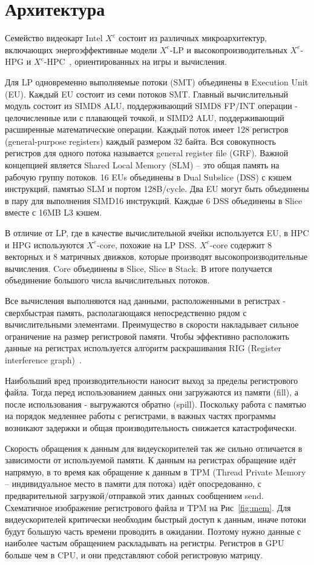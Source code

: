 \section{Архитектура}
\label{sec:Arch}

Семейство видеокарт Intel $X^e$ состоит из различных микроархитектур, включающих энергоэффективные модели $X^e$-LP и высокопроизводительных $X^e$-HPG и $X^e$-HPC~\cite{intelArch}, ориентированных на игры и вычисления.

Для LP одновременно выполняемые потоки (SMT) объединены в Execution Unit (EU).
Каждый EU состоит из семи потоков SMT. Главный вычислительный модуль состоит из SIMD8 ALU, поддерживающий SIMD8 FP/INT операции - целочисленные или с плавающей точкой, и SIMD2 ALU, поддерживающий расширенные математические операции.
Каждый поток имеет 128 регистров (general-purpose registers) каждый размером 32 байта.
Вся совокупность регистров для одного потока называется general register file (GRF).
Важной концепцией является Shared Local Memory (SLM) -- это общая память на рабочую группу потоков.
16 EUs объединены в Dual Subslice (DSS) с кэшем инструкций, памятью SLM и портом 128B/cycle.
Два EU могут быть объединены в пару для выполнения SIMD16 инструкций. Каждые 6 DSS объединены в Slice вместе с 16MB L3 кэшем.

В отличие от LP, где в качестве вычислительной ячейки используется EU, в HPC и HPG используются $X^e$-core, похожие на LP DSS.
$X^e$-core содержит 8 векторных и 8 матричных движков, которые производят высокопроизводительные вычисления.
Core объединены в Slice, Slice в Stack.
В итоге получается объединение большого числа вычислительных потоков.

Все вычисления выполняются над данными, расположенными в регистрах - сверхбыстрая память, располагающаяся непосредственно рядом с вычислительными элементами.
Преимущество в скорости накладывает сильное ограничение на размер регистровой памяти.
Чтобы эффективно расположить данные на регистрах используется алгоритм раскрашивания RIG (Register interference graph)~\cite{regalloc}.

Наибольший вред производительности наносит выход за пределы регистрового файла. Тогда перед использованием данных они загружаются из памяти (fill), а после использования - выгружаются обратно (spill). Поскольку работа с памятью на порядок медленнее работы с регистрами, в важных частях программы возникают задержки и общая производительность снижается катастрофически.

Скорость обращения к данным для видеускорителей так же сильно отличается в зависимости от используемой памяти. К данным на регистрах обращение идёт напрямую, в то время как обращение к данным в TPM (Thread Private Memory -- индивидуальное место в памяти для потока) идёт опосредованно, с предварительной загрузкой/отправкой этих данных сообщением send. Схематичное изображение регистрового файла и TPM на Рис~\ref{fig:mem}. Для видеускорителей критически необходим быстрый доступ к данным, иначе потоки будут большую часть времени проводить в ожидании. Поэтому нужно данные с наиболее частым обращением раскладывать на регистры. Регистров в GPU больше чем в CPU, и они представляют собой регистровую матрицу.

